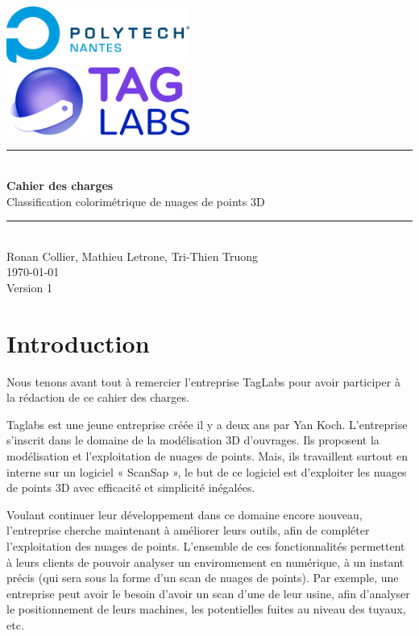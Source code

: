 \documentclass[12pt,titlepage]{report}
\begin{document}
\renewcommand{\thesection}{\arabic{section}} %

\begin{titlepage}
\newcommand{\HRule}{\rule{\linewidth}{0.5mm}}
\center

	\includegraphics[width=0.45\textwidth]{./image2.png}\\[1cm]
   
	\includegraphics[width=0.45\textwidth]{./image1.png}


\HRule \\[0.4cm]
{ \huge \bfseries Cahier des charges \\[0.15cm] }
Classification colorimétrique de nuages de points 3D
\HRule \\[1.5cm]
Ronan Collier,
Mathieu Letrone,
Tri-Thien Truong
\\[1cm]
\today \\ [1cm]
Version 1
\end{titlepage}


\section{Introduction}

Nous tenons avant tout à remercier l'entreprise TagLabs pour avoir participer à la rédaction de ce cahier des charges.

\vspace{\baselineskip}
Taglabs est une jeune entreprise créée il y a deux ans par Yan Koch. L’entreprise s’inscrit dans le domaine de la modélisation 3D d’ouvrages. Ils proposent la modélisation et l’exploitation de nuages de points. Mais, ils travaillent surtout en interne sur un logiciel « ScanSap », le but de ce logiciel est d’exploiter les nuages de points 3D avec efficacité et simplicité inégalées.

Voulant continuer leur développement dans ce domaine encore nouveau, l'entreprise cherche maintenant à améliorer leurs outils, afin de compléter l'exploitation des nuages de points. L'ensemble de ces fonctionnalités permettent à leurs clients de pouvoir analyser un environnement en numérique, à un instant précis (qui sera sous la forme d'un scan de nuages de points). Par exemple, une entreprise peut avoir le besoin d'avoir un scan d'une de leur usine, afin d'analyser le positionnement de leurs machines, les potentielles fuites au niveau des tuyaux, etc.
\end{document}
